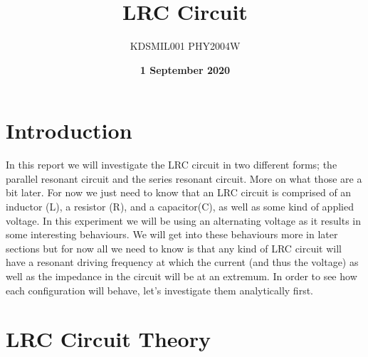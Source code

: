 \documentclass[12pt]{article}
\title{LRC Circuit}
\date{\textbf{1 September 2020}}
\author{KDSMIL001 \; PHY2004W}
\numberwithin{equation}{section}
\numberwithin{figure}{section}
\begin{document}
    \begin{titlepage}
        \maketitle
        \center
        \tableofcontents
    \end{titlepage}
    
    \section{Introduction}\label{sec:Introduction}
    In this report we will investigate the LRC circuit in two different forms; the parallel resonant 
    circuit and the series resonant circuit. More on what those are a bit later. For now we just need 
    to know that an LRC circuit is comprised of an inductor (L), a resistor (R), and a capacitor(C), 
    as well as some kind of applied voltage. In this experiment we will be using an alternating voltage 
    as it results in some interesting behaviours. We will get into these behaviours more in later 
    sections but for now all we need to know is that any kind of LRC circuit will have a resonant 
    driving frequency at which the current (and thus the voltage) as well as the impedance in the 
    circuit will be at an extremum. In order to see how each configuration will behave, let's 
    investigate them analytically first.

    \section{LRC Circuit Theory}\label{sec:Theory}
\end{document}
